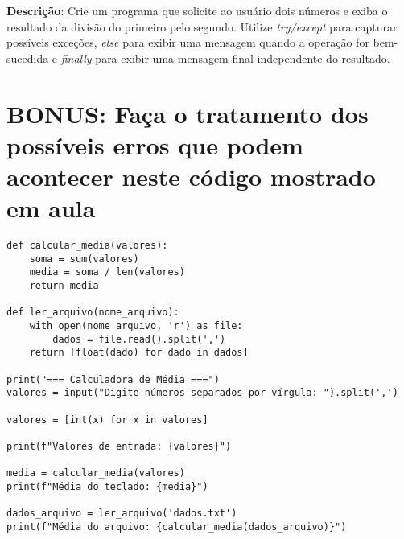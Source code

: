 \textbf{Descrição}:
Crie um programa que solicite ao usuário dois números e exiba o resultado da divisão do primeiro pelo segundo. Utilize \textit{try/except} para capturar possíveis exceções, \textit{else} para exibir uma mensagem quando a operação for bem-sucedida e \textit{finally} para exibir uma mensagem final independente do resultado.


\pagebreak


\section{\textbf{BONUS}: Faça o tratamento dos possíveis erros que podem acontecer neste código mostrado em aula}

\begin{verbatim}
def calcular_media(valores):
    soma = sum(valores)
    media = soma / len(valores)
    return media

def ler_arquivo(nome_arquivo):
    with open(nome_arquivo, 'r') as file:
        dados = file.read().split(',')
    return [float(dado) for dado in dados]

print("=== Calculadora de Média ===")
valores = input("Digite números separados por vírgula: ").split(',')

valores = [int(x) for x in valores]

print(f"Valores de entrada: {valores}")

media = calcular_media(valores)
print(f"Média do teclado: {media}")

dados_arquivo = ler_arquivo('dados.txt')
print(f"Média do arquivo: {calcular_media(dados_arquivo)}")

\end{verbatim}


